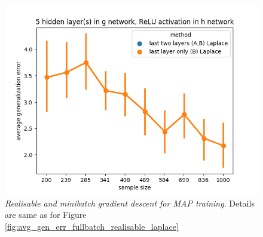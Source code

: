 \documentclass{article} %
\begin{document}
\begin{figure}[t!]
\begin{center}
		\includegraphics[scale=0.35]{laplace_taskid15.png}
	\end{center}
	\caption{\textit{Realisable and minibatch gradient descent for MAP training}. Details are same as for Figure \ref{fig:avg_gen_err_fullbatch_realisable_laplace}}
	\label{fig:avg_gen_err_minibatch_realisable_laplace}
\end{figure}
\end{document}
